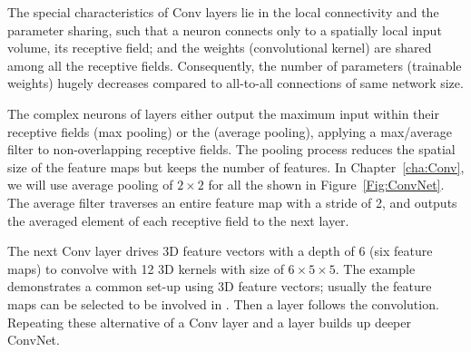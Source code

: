 The special characteristics of Conv layers lie in the local connectivity and the parameter sharing, such that a neuron connects only to a spatially local input volume, its receptive field; and the weights (\DIFaddbegin {}\DIFaddend convolutional kernel) are shared among all the receptive fields.
Consequently, the number of parameters (trainable weights) hugely decreases compared to all-to-all connections of \DIFaddbegin {}\DIFaddend same network size. 

The complex neurons of \DIFdelbegin {}\DIFdelend \DIFaddbegin {}\DIFaddend layers either output the maximum input within their receptive fields (max pooling) or the \DIFdelbegin {}\DIFdelend \DIFaddbegin {}\DIFaddend (average pooling), \DIFdelbegin {}\DIFdelend \DIFaddbegin {}\DIFaddend applying a max/average filter to non-overlapping receptive fields.
The pooling process reduces the spatial size of the feature maps but keeps the number of features.
In Chapter~\ref{cha:Conv}, we will use average pooling of $2\times2$ for all the \DIFdelbegin {}\DIFdelend \DIFaddbegin {}\DIFaddend shown in Figure~\ref{Fig:ConvNet}.
The average filter traverses \DIFdelbegin {}\DIFdelend an entire feature map with a stride of 2, and outputs the averaged element of each receptive field to the next layer.

The next Conv layer drives 3D feature vectors with a depth of 6 (six feature maps) to convolve with 12 3D kernels with size of $6\times5\times5$.
The example demonstrates a common set-up using \DIFdelbegin {}\DIFdelend \DIFaddbegin {}\DIFaddend 3D feature vectors; usually the \DIFaddbegin {}\DIFaddend feature maps can be selected to \DIFaddbegin {}\DIFaddend be involved in \DIFdelbegin {}\DIFdelend \DIFaddbegin {}\DIFaddend .
Then a \DIFdelbegin {}\DIFdelend \DIFaddbegin {}\DIFaddend layer follows the convolution.
Repeating these alternative \DIFdelbegin {}\DIFdelend \DIFaddbegin {}\DIFaddend of a Conv layer and a \DIFdelbegin {}\DIFdelend \DIFaddbegin {}\DIFaddend layer builds up \DIFaddbegin {}\DIFaddend deeper ConvNet.

